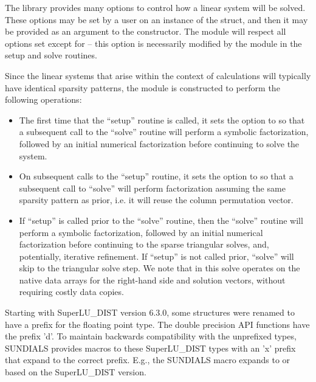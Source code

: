 The {\superludist} library provides many options to control how a linear
system will be solved. These options may be set by a user on an instance
of the  struct, and then it may be provided
as an argument to the {\sunlinsolsludist} constructor. The {\sunlinsolsludist}
module will respect all options set except for  -- this option is
necessarily modified by the {\sunlinsolsludist} module in the setup and solve routines.

Since the linear systems that arise within the context of {\sundials}
calculations will typically have identical sparsity patterns, the
{\sunlinsolsludist} module is constructed to perform the
following operations:
\begin{itemize}
\item The first time that the ``setup'' routine is called, it
  sets the {\superludist} option  to  so that a subsequent
  call to the ``solve'' routine will perform a symbolic factorization,
  followed by an initial numerical factorization before continuing
  to solve the system.
\item On subsequent calls to the ``setup'' routine, it sets the
  {\superludist} option  to  so that
  a subsequent call to ``solve'' will perform factorization assuming
  the same sparsity pattern as prior, i.e. it will reuse the column
  permutation vector.
\item If ``setup'' is called prior to the ``solve'' routine, then the ``solve''
  routine will perform a symbolic factorization, followed by an initial
  numerical factorization before continuing to the sparse triangular
  solves, and, potentially, iterative refinement. If ``setup'' is not
  called prior, ``solve'' will skip to the triangular solve step. We
  note that in this solve {\superludist} operates on the native data arrays
  for the right-hand side and solution vectors, without requiring costly data copies.
\end{itemize}


{\warn} Starting with SuperLU\_DIST version 6.3.0, some structures were renamed
to have a prefix for the floating point type. The double precision API functions
have the prefix 'd'. To maintain backwards compatibility with the unprefixed
types, SUNDIALS provides macros to these SuperLU\_DIST types with an 'x' prefix
that expand to the correct prefix. E.g., the SUNDIALS macro 
expands to  or  based on the SuperLU\_DIST
version.


